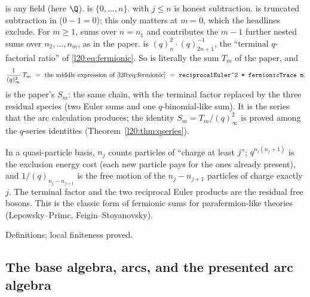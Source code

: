 \begin{dictionary}
 is any field (here $\Q$).  is $\{0,\dots,n\}$.  with
$j\le n$ is honest subtraction.  is truncated subtraction in  ($0-1=0$); this only matters
at $m=0$, which the headlines exclude. For $m\ge1$,  sums over $n=n_1$ and
 contributes the $m-1$ further nested sums over $n_2,\dots,n_m$, as in the paper.  is $(q)_n^2\cdot(q)_{2n+1}^{-1}$, the ``terminal
$q$-factorial ratio'' of \eqref{l20:eq:fermionic}. So  is literally the sum
$T_m$ of the paper, and
\begin{equation*}
\frac{1}{(q)_\infty^2}\,T_m\ =\ \text{the middle expression of \eqref{l20:eq:fermionic}}
\ =\ \texttt{reciprocalEuler\^{}2 * fermionicTrace m}.
\end{equation*}
 is the paper's $S_m$: the same chain, with the terminal factor replaced by the
three residual species (two Euler sums and one $q$-binomial-like sum). It is the series that the arc
calculation produces; the identity $S_m=T_m/(q)_\infty^2$ is proved among the $q$-series identities (Theorem~\ref{l20:thm:qseries}).
\end{dictionary}

\begin{physics}
In a quasi-particle basis, $n_j$ counts particles of ``charge at least $j$''; $q^{n_j(n_j+1)}$ is the
exclusion energy cost (each new particle pays for the ones already present), and $1/(q)_{n_j-n_{j+1}}$ is the
free motion of the $n_j-n_{j+1}$ particles of charge exactly $j$. The terminal factor and the two reciprocal
Euler products are the residual free bosons. This is the classic form of fermionic sums for
parafermion-like theories (Lepowsky--Primc, Feigin--Stoyanovsky).
\end{physics}

\begin{status}
Definitions; local finiteness proved.
\end{status}

\subsection{The base algebra, arcs, and the presented arc algebra}

